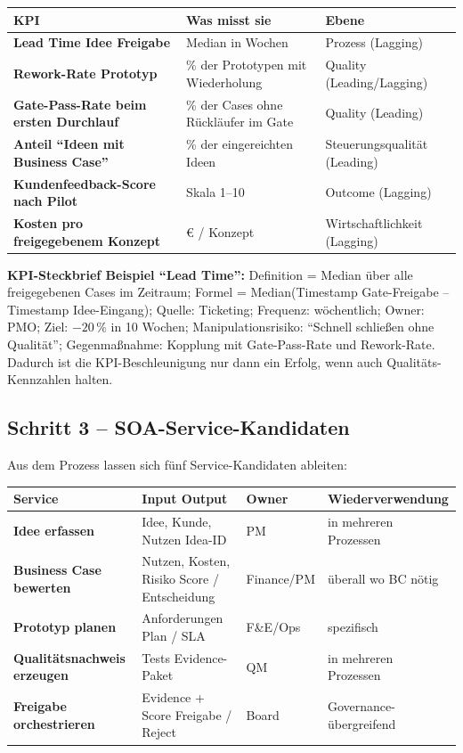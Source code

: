 \documentclass[11pt,a4paper,oneside]{article}
\begin{document}
\begin{tabularx}{\linewidth}{@{}>{\bfseries}lXl@{}}
\toprule
KPI & Was misst sie & Ebene \\
\midrule
Lead Time Idee \textrightarrow{} Freigabe & Median in Wochen & Prozess (Lagging) \\
Rework-Rate Prototyp                    & \% der Prototypen mit Wiederholung & Quality (Leading/Lagging) \\
Gate-Pass-Rate beim ersten Durchlauf    & \% der Cases ohne Rückläufer im Gate & Quality (Leading) \\
Anteil ``Ideen mit Business Case''       & \% der eingereichten Ideen & Steuerungsqualität (Leading) \\
Kundenfeedback-Score nach Pilot          & Skala 1--10                & Outcome (Lagging) \\
Kosten pro freigegebenem Konzept         & \euro{} / Konzept           & Wirtschaftlichkeit (Lagging) \\
\bottomrule
\end{tabularx}

\medskip

\noindent \textbf{KPI-Steckbrief Beispiel ``Lead Time'':} Definition = Median über alle freigegebenen Cases im Zeitraum; Formel = Median(Timestamp Gate-Freigabe -- Timestamp Idee-Eingang); Quelle: Ticketing; Frequenz: wöchentlich; Owner: PMO; Ziel: $-20\,\%$ in 10 Wochen; Manipulationsrisiko: ``Schnell schließen ohne Qualität''; Gegenmaßnahme: Kopplung mit Gate-Pass-Rate und Rework-Rate. Dadurch ist die KPI-Beschleunigung nur dann ein Erfolg, wenn auch Qualitäts-Kennzahlen halten.

\subsection{Schritt 3 -- SOA-Service-Kandidaten}

Aus dem Prozess lassen sich fünf Service-Kandidaten ableiten:

\begin{tabularx}{\linewidth}{@{}>{\bfseries}lXll@{}}
\toprule
Service & Input \textrightarrow{} Output & Owner & Wiederverwendung \\
\midrule
Idee erfassen            & Idee, Kunde, Nutzen \textrightarrow{} Idea-ID                & PM        & in mehreren Prozessen \\
Business Case bewerten   & Nutzen, Kosten, Risiko \textrightarrow{} Score / Entscheidung & Finance/PM & überall wo BC nötig \\
Prototyp planen          & Anforderungen \textrightarrow{} Plan / SLA                   & F\&E/Ops  & spezifisch \\
Qualitätsnachweis erzeugen & Tests \textrightarrow{} Evidence-Paket                     & QM        & in mehreren Prozessen \\
Freigabe orchestrieren   & Evidence + Score \textrightarrow{} Freigabe / Reject         & Board     & Governance-übergreifend \\
\bottomrule
\end{tabularx}
\end{document}
